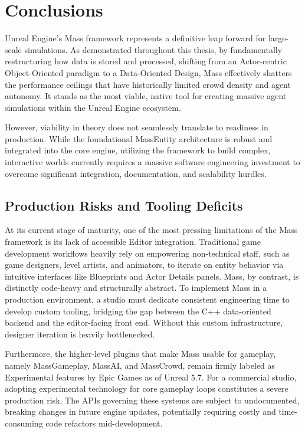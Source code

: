 \chapter{Conclusions}
\label{sec:Conclusions}

Unreal Engine’s Mass framework represents a definitive leap forward for large-scale simulations. As demonstrated throughout this thesis, by fundamentally restructuring how data is stored and processed, shifting from an Actor-centric Object-Oriented paradigm to a Data-Oriented Design, Mass effectively shatters the performance ceilings that have historically limited crowd density and agent autonomy. It stands as the most viable, native tool for creating massive agent simulations within the Unreal Engine ecosystem.

However, viability in theory does not seamlessly translate to readiness in production. While the foundational MassEntity architecture is robust and integrated into the core engine, utilizing the framework to build complex, interactive worlds currently requires a massive software engineering investment to overcome significant integration, documentation, and scalability hurdles.

\section{Production Risks and Tooling Deficits}

At its current stage of maturity, one of the most pressing limitations of the Mass framework is its lack of accessible Editor integration. Traditional game development workflows heavily rely on empowering non-technical staff, such as game designers, level artists, and animators, to iterate on entity behavior via intuitive interfaces like Blueprints and Actor Details panels. Mass, by contrast, is distinctly code-heavy and structurally abstract. To implement Mass in a production environment, a studio must dedicate consistent engineering time to develop custom tooling, bridging the gap between the C++ data-oriented backend and the editor-facing front end. Without this custom infrastructure, designer iteration is heavily bottlenecked.

Furthermore, the higher-level plugins that make Mass usable for gameplay, namely MassGameplay, MassAI, and MassCrowd, remain firmly labeled as Experimental features by Epic Games as of Unreal 5.7. For a commercial studio, adopting experimental technology for core gameplay loops constitutes a severe production risk. The APIs governing these systems are subject to undocumented, breaking changes in future engine updates, potentially requiring costly and time-consuming code refactors mid-development.

